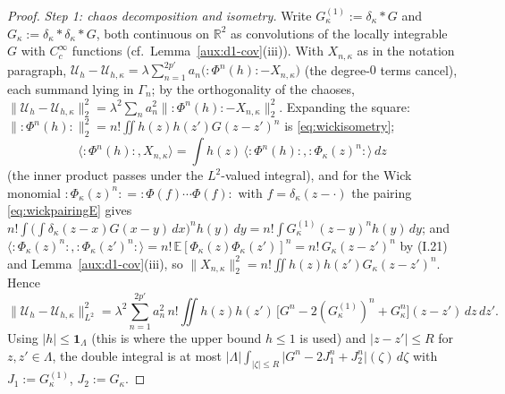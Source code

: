 \documentclass[11pt,a4paper]{article}
\theoremstyle{plain}
\theoremstyle{definition}
\theoremstyle{plain}
\theoremstyle{definition}
\newcommand{\R}{\mathbb{R}}
\newcommand{\E}{\mathbb{E}}
\newcommand{\ip}[2]{\langle #1,#2\rangle}
\begin{document}
\begin{proof}
\emph{Step 1: chaos decomposition and isometry.}  Write $G^{(1)}_\kappa:=\delta_\kappa*G$ and
$G_\kappa:=\delta_\kappa*\delta_\kappa*G$, both continuous on $\R^2$ as convolutions of the
locally integrable $G$ with $C_c^\infty$ functions (cf.\ Lemma~\ref{aux:d1-cov}(iii)).  With
$X_{n,\kappa}$ as in the notation paragraph,
$\mathcal U_h-\mathcal U_{h,\kappa}=\lambda\sum_{n=1}^{2p'}a_n\bigl({:}\Phi^n(h){:}-X_{n,\kappa}
\bigr)$ (the degree-$0$ terms cancel), each summand lying in $\Gamma_n$; by the
orthogonality of the chaoses,
$\|\mathcal U_h-\mathcal U_{h,\kappa}\|_2^2=\lambda^2\sum_na_n^2\|{:}\Phi^n(h){:}-X_{n,\kappa}
\|_2^2$.  Expanding the square: $\|{:}\Phi^n(h){:}\|_2^2=n!\iint h(z)h(z')G(z-z')^n$ is
\eqref{eq:wickisometry};
\[
 \ip{{:}\Phi^n(h){:}}{X_{n,\kappa}}=\int h(z)\,\ip{{:}\Phi^n(h){:}}{{:}\Phi_\kappa(z)^n{:}}\,dz
\]
(the inner product passes under the $L^2$-valued integral), and
for the Wick monomial ${:}\Phi_\kappa(z)^n{:}={:}\Phi(f)\cdots\Phi(f){:}$ with $f=\delta_\kappa
(z-\cdot)$ the pairing \eqref{eq:wickpairingE} gives $n!\int\bigl(\int\delta_\kappa(z-x)G(x-y)
\,dx\bigr)^nh(y)\,dy=n!\int G^{(1)}_\kappa(z-y)^nh(y)\,dy$; and $\ip{{:}\Phi_\kappa(z)^n{:}}
{{:}\Phi_\kappa(z')^n{:}}=n!\,\E[\Phi_\kappa(z)\Phi_\kappa(z')]^n=n!\,G_\kappa(z-z')^n$ by
(I.21) and Lemma~\ref{aux:d1-cov}(iii), so $\|X_{n,\kappa}\|_2^2=n!\iint h(z)h(z')G_\kappa
(z-z')^n$.  Hence
\[
  \|\mathcal U_h-\mathcal U_{h,\kappa}\|_{L^2}^2
  =\lambda^2\sum_{n=1}^{2p'}a_n^2\,n!\iint h(z)h(z')\,
  \bigl[G^n-2(G^{(1)}_\kappa)^n+G_\kappa^n\bigr](z-z')\,dz\,dz' .
\]
Using $|h|\le\mathbf 1_\Lambda$ (this is where the upper bound $h\le1$ is used) and
$|z-z'|\le R$ for $z,z'\in\Lambda$, the double integral is at most
$|\Lambda|\int_{|\zeta|\le R}\bigl|G^n-2J_1^n+J_2^n\bigr|(\zeta)\,d\zeta$ with
$J_1:=G^{(1)}_\kappa$, $J_2:=G_\kappa$.


\end{proof}
\end{document}
